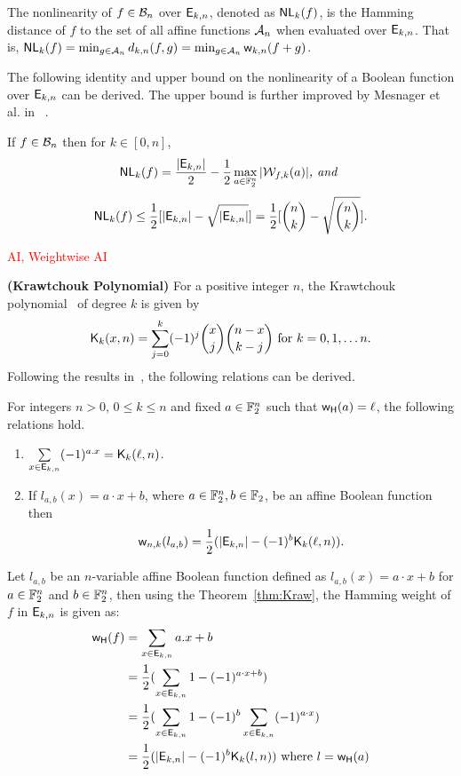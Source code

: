 \documentclass{llncs}
\begin{document}
\begin{definition}\label{def:wtNl}
The nonlinearity of $f \in \mathcal{B}_n$ over $\mathsf{E}_{k,n}$, denoted as $\mathsf{NL}_{k}(f)$, is the Hamming distance of $f$ to the set of all affine functions $\mathcal{A}_n$ when evaluated over $\mathsf{E}_{k,n}$. 
That is, $\mathsf{NL}_{k}(f) = \min_{g \in \mathcal{A}_n} d_{k,n}(f,g) = \min_{g \in \mathcal{A}_n} \mathsf{w}_{k,n}(f+g)$.\\
\end{definition}




The following identity and upper bound on the nonlinearity of a Boolean function over $\mathsf{E}_{k,n}$ can be derived. The upper bound is further improved by Mesnager et al. in ~\cite{Mesnager2018}.
\begin{lemma}\label{lem:wnl}
If $f \in \mathcal{B}_n$ then for $k \in [0,n]$, 
\[\mathsf{NL}_{k}(f) = \frac{|\mathsf{E}_{k,n}|}{2}- \frac{1}{2}\max_{a \in \mathbb{F}_2^n} |\mathcal{W}_{f,k}(a)| \textit{, and } \]
\[\mathsf{NL}_{k}(f) \leq \frac{1}{2} [|\mathsf{E}_{k,n}| - \sqrt{|\mathsf{E}_{k,n}|}] = \frac{1}{2} [{n \choose k} - \sqrt{{n \choose k}}].\]
\end{lemma}

\textcolor{red}{AI, Weightwise AI}

\noindent\textbf{(Krawtchouk Polynomial)} For a positive integer $n$, the Krawtchouk polynomial~\cite[Page $151$]{book:MacSlo78} of degree $k$ is given by 
\[\mathsf{K}_{k}(x,n)= \sum_{j=0}^{k} (-1)^j {x \choose j} {n-x \choose k-j} \text{ for } k = 0, 1, \ldots n.\]
Following the results in~\cite{DCC:DalMaiSar06,DAM:GinMea22}, the following relations can be derived.
\begin{theorem} \label{thm:Kraw}
For integers $n > 0$, $0 \leq k \leq n$ and fixed $a \in \mathbb{F}_2^n$ such that $\mathsf{w_H}(a) = \ell$, the following relations hold.
\begin{enumerate}
\item $\sum\limits_{x \in \mathsf{E}_{k,n}} (-1)^{a.x} = \mathsf{K}_{k}(\ell,n)$.
\item If $l_{a,b}(x)= a \cdot x + b$, where $a \in \mathbb{F}_2^n, b \in \mathbb{F}_2$, be an affine Boolean function then 
\[\mathsf{w}_{n,k}(l_{a,b}) = \frac{1}{2} (|\mathsf{E}_{k,n}| - (-1)^b \mathsf{K}_{k}(\ell,n)).\]
\end{enumerate}
\end{theorem}
\iffalse
Let $l_{a,b}$ be an $n$-variable affine Boolean function defined as $l_{a,b}(x)= a \cdot x + b$ for $a \in \mathbb{F}_2^n$ and $ b \in \mathbb{F}_2^n$, then using the Theorem~\ref{thm:Kraw}, the Hamming weight of $f$ in $\mathsf{E}_{k,n}$ is given as:
\begin{align*}
\mathsf{w_H}(f) & = \sum_{x \in \mathsf{E}_{k,n}} a.x + b \\
      & = \frac{1}{2}(\sum_{ x \in \mathsf{E}_{k,n}} 1 - (-1)^{a \cdot x + b} )   \\
      & = \frac{1}{2}(\sum_{ x \in \mathsf{E}_{k,n}} 1 - (-1)^b  \sum_{ x \in \mathsf{E}_{k,n}}  (-1)^{a \cdot x}) \\    & = \frac{1}{2} (|\mathsf{E}_{k,n}| - (-1)^b \mathsf{K}_{k}(l,n) )  \text{ where } l = \mathsf{w_H}(a)
\end{align*} 
\end{document}
